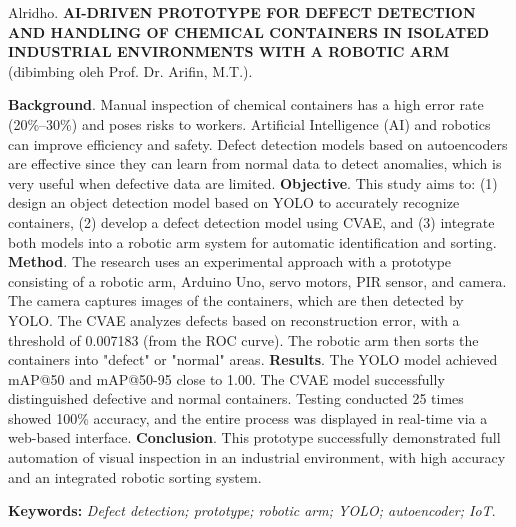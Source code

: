 \noindent
Alridho. \textbf{ AI-DRIVEN PROTOTYPE FOR DEFECT DETECTION AND HANDLING OF CHEMICAL CONTAINERS IN ISOLATED INDUSTRIAL ENVIRONMENTS WITH A ROBOTIC ARM} (dibimbing oleh Prof. Dr. Arifin, M.T.). \par

\vspace*{0.1cm}
 
\noindent
\textbf{Background}. Manual inspection of chemical containers has a high error rate (20\%–30\%) and poses risks to workers. Artificial Intelligence (AI) and robotics can improve efficiency and safety. Defect detection models based on autoencoders are effective since they can learn from normal data to detect anomalies, which is very useful when defective data are limited. \textbf{Objective}. This study aims to: (1) design an object detection model based on YOLO to accurately recognize containers, (2) develop a defect detection model using CVAE, and (3) integrate both models into a robotic arm system for automatic identification and sorting. \textbf{Method}. The research uses an experimental approach with a prototype consisting of a robotic arm, Arduino Uno, servo motors, PIR sensor, and camera. The camera captures images of the containers, which are then detected by YOLO. The CVAE analyzes defects based on reconstruction error, with a threshold of 0.007183 (from the ROC curve). The robotic arm then sorts the containers into "defect" or "normal" areas. \textbf{Results}. The YOLO model achieved mAP@50 and mAP@50-95 close to 1.00. The CVAE model successfully distinguished defective and normal containers. Testing conducted 25 times showed 100\% accuracy, and the entire process was displayed in real-time via a web-based interface. \textbf{Conclusion}. This prototype successfully demonstrated full automation of visual inspection in an industrial environment, with high accuracy and an integrated robotic sorting system.


\vspace*{0.1cm}

\noindent
\textbf{Keywords:} \textit{Defect detection; prototype; robotic arm; YOLO; autoencoder; IoT}.

\endgroup

